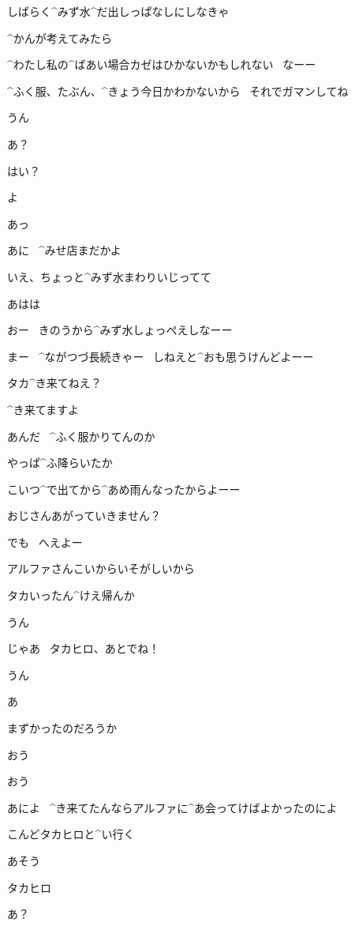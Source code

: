 \Alpha しばらく^{みず}{水}^{だ}{出}しっぱなしにしなきゃ

\Alpha ^{かんが}{考}えてみたら

\Alpha ^{わたし}{私}の^{ばあい}{場合}カゼはひかないかもしれない
\ なーー

\page
\Alpha ^{ふく}{服}、たぶん、^{きょう}{今日}かわかないから
\ それでガマンしてね

\Takahiro うん

\Alpha あ？

\page
\Alpha はい？

\Ojisan よ

\Alpha あっ

\Ojisan あに
\ ^{みせ}{店}まだかよ

\Alpha いえ、ちょっと^{みず}{水}まわりいじってて

\Alpha あはは

\Ojisan おー
\ きのうから^{みず}{水}しょっぺえしなーー

\Ojisan まー
\ ^{ながつづ}{長続}きゃー
\ しねえと^{おも}{思}うけんどよーー

\Ojisan タカ^{き}{来}てねえ？

\page
\Alpha ^{き}{来}てますよ

\Ojisan あんだ
\ ^{ふく}{服}かりてんのか

\Ojisan やっぱ^{ふ}{降}らいたか

\Ojisan こいつ^{で}{出}てから^{あめ}{雨}んなったからよーー

\Alpha おじさんあがっていきません？

\Ojisan でも
\ へえよー

\Ojisan アルファさんこいからいそがしいから

\Ojisan タカいったん^{けえ}{帰}んか

\Takahiro うん

\page
\Alpha じゃあ
\ タカヒロ、あとでね！

\Takahiro うん

\Alpha あ

\Alpha まずかったのだろうか

\page
\Takahiro おう

\Makki おう

\page
\Takahiro あによ
\ ^{き}{来}てたんならアルファに^{あ}{会}ってけばよかったのによ

\Makki こんどタカヒロと^{い}{行}く

\Takahiro あそう

\page
\Makki タカヒロ

\Takahiro あ？

